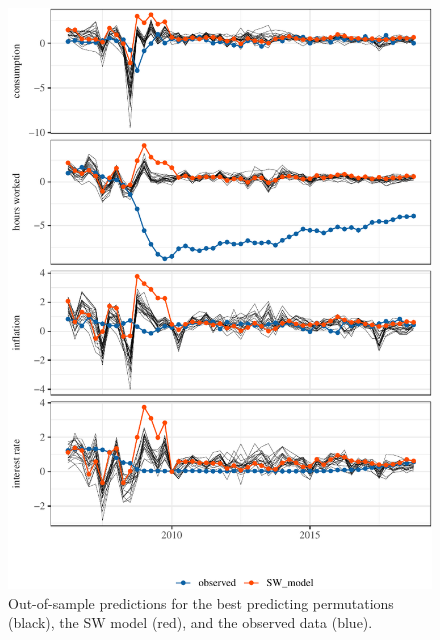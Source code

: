 \documentclass[11pt]{article}
\begin{document}
\begin{figure}[t]

{\centering \includegraphics{gfx/pc-preds-p1-1} 

}

\caption{Out-of-sample predictions for the best predicting permutations (black), the SW model (red), and the observed data (blue).}\label{fig:pc-preds-p1}
\end{figure}
\end{document}
